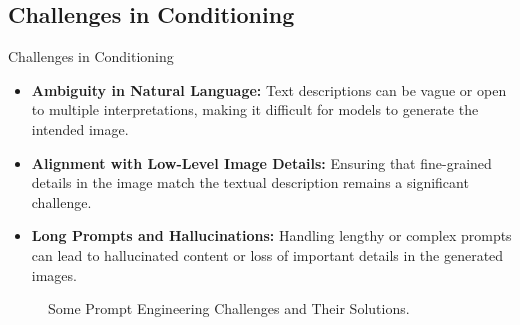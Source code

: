 \subsection{Challenges in Conditioning}
\begin{frame}[allowframebreaks]{Challenges in Conditioning}
    \begin{itemize}
        \item \textbf{Ambiguity in Natural Language:} Text descriptions can be vague or open to multiple interpretations, making it difficult for models to generate the intended image.
        \item \textbf{Alignment with Low-Level Image Details:} Ensuring that fine-grained details in the image match the textual description remains a significant challenge.
        \item \textbf{Long Prompts and Hallucinations:} Handling lengthy or complex prompts can lead to hallucinated content or loss of important details in the generated images.
    \end{itemize}
\framebreak
    \begin{figure}
        \centering
        \caption*{Some Prompt Engineering Challenges and Their Solutions.}
    \end{figure}
\end{frame}